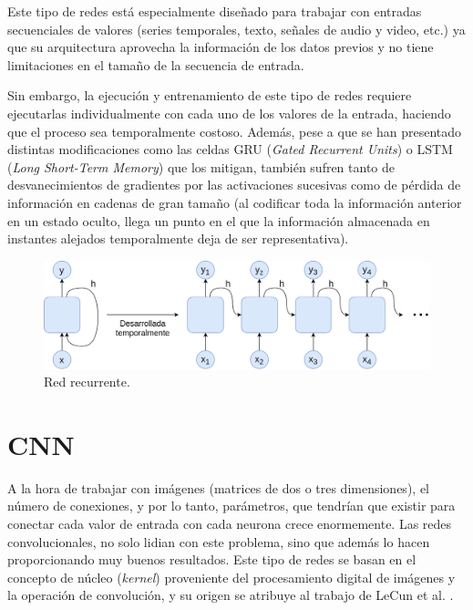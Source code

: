 Este tipo de redes está especialmente diseñado para trabajar con entradas secuenciales de valores (series temporales, texto, señales de audio y video, etc.) ya que su arquitectura aprovecha la información de los datos previos y no tiene limitaciones en el tamaño de la secuencia de entrada.

Sin embargo, la ejecución y entrenamiento de este tipo de redes requiere ejecutarlas individualmente con cada uno de los valores de la entrada, haciendo que el proceso sea temporalmente costoso. Además, pese a que se han presentado distintas modificaciones como las celdas GRU (\textit{Gated Recurrent Units}) \cite{cho-etal-2014-learning} o LSTM (\textit{Long Short-Term Memory}) \cite{HochSchm97} que los mitigan, también sufren tanto de desvanecimientos de gradientes por las activaciones sucesivas como de pérdida de información en cadenas de gran tamaño (al codificar toda la información anterior en un estado oculto, llega un punto en el que la información almacenada en instantes alejados temporalmente deja de ser representativa).

\begin{figure}[H]
\centering
\includegraphics[width=0.8\linewidth]{imagenes/rnn.png} 
\captionsetup{width=.8\linewidth}
\caption{Red recurrente.}
\label{fig:rnn}
\end{figure}

\section{CNN}
A la hora de trabajar con imágenes (matrices de dos o tres dimensiones), el número de conexiones, y por lo tanto, parámetros, que tendrían que existir para conectar cada valor de entrada con cada neurona crece enormemente. Las redes convolucionales, no solo lidian con este problema, sino que además lo hacen proporcionando muy buenos resultados. Este tipo de redes se basan en el concepto de núcleo (\textit{kernel}) proveniente del procesamiento digital de imágenes y la operación de convolución, y su origen se atribuye al trabajo de LeCun et al. \cite{LeCun1999}.

